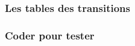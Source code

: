 \subsubsection{Les tables des transitions} \label{2-or-3}

	


\subsubsection{Coder pour tester}

	

